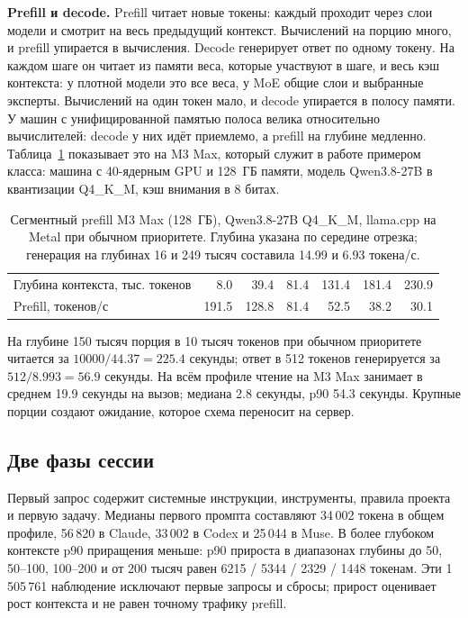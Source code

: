 \textbf{Prefill и decode.} Prefill читает новые токены: каждый проходит через слои модели и смотрит на весь
предыдущий контекст. Вычислений на порцию много, и prefill упирается в вычисления. Decode генерирует ответ по одному
токену. На каждом шаге он читает из памяти веса, которые участвуют в шаге, и весь кэш контекста: у плотной модели
это все веса, у MoE общие слои и выбранные эксперты. Вычислений на один токен мало, и decode упирается в полосу
памяти. У машин с
унифицированной памятью полоса велика относительно вычислителей: decode у них идёт приемлемо, а prefill на глубине
медленно. Таблица~\ref{tab:m3max} показывает это на M3 Max, который служит в работе примером класса: машина
с 40-ядерным GPU и 128~ГБ памяти, модель Qwen3.8-27B в квантизации Q4\_K\_M, кэш внимания в 8 битах.

\begin{table}[t]
\centering
\caption{Сегментный prefill M3 Max (128~ГБ), Qwen3.8-27B Q4\_K\_M,
llama.cpp на Metal при обычном приоритете. Глубина указана по середине отрезка;
генерация на глубинах 16 и 249 тысяч составила 14.99 и 6.93 токена/с.}
\label{tab:m3max}
\footnotesize
\begin{tabular}{lrrrrrr}
\toprule
Глубина контекста, тыс. токенов & 8.0 & 39.4 & 81.4 & 131.4 & 181.4 & 230.9 \\
Prefill, токенов/с & 191.5 & 128.8 & 81.4 & 52.5 & 38.2 & 30.1 \\
\bottomrule
\end{tabular}
\end{table}

На глубине 150 тысяч порция в 10 тысяч токенов при обычном приоритете читается за $10000/44.37=225.4$ секунды;
ответ в 512 токенов генерируется за $512/8.993=56.9$ секунды. На всём профиле чтение на M3 Max занимает в среднем 19.9 секунды на вызов;
медиана 2.8 секунды, p90 54.3 секунды. Крупные порции создают ожидание,
которое схема переносит на сервер.

\subsection{Две фазы сессии}
\label{sec:session-phases}
Первый запрос содержит системные инструкции, инструменты, правила проекта и первую задачу.
Медианы первого промпта составляют 34\,002 токена в общем профиле, 56\,820 в Claude,
33\,002 в Codex и 25\,044 в Muse. В более глубоком контексте p90 приращения меньше:
p90 прироста в диапазонах глубины до 50, 50--100, 100--200 и от 200 тысяч равен
6215 / 5344 / 2329 / 1448 токенам. Эти 1\,505\,761 наблюдение исключают первые запросы и сбросы;
прирост оценивает рост контекста и не равен точному трафику prefill.

